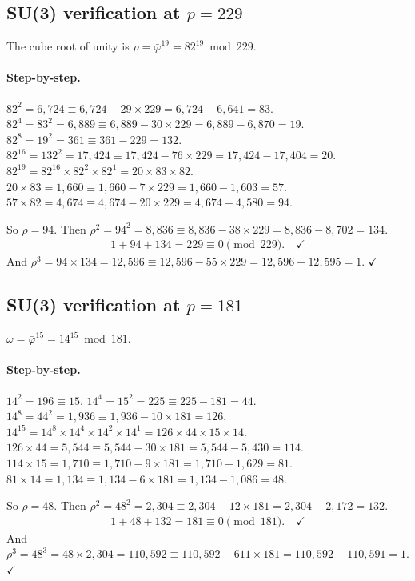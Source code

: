 \subsection{SU(3) verification at $p = 229$}

The cube root of unity is $\rho = \bar\varphi^{19} = 82^{19} \bmod 229$.

\paragraph{Step-by-step.}
$82^2 = 6{,}724 \equiv 6{,}724 - 29 \times 229 = 6{,}724 - 6{,}641 = 83$.
$82^4 = 83^2 = 6{,}889 \equiv 6{,}889 - 30 \times 229 = 6{,}889 - 6{,}870 = 19$.
$82^8 = 19^2 = 361 \equiv 361 - 229 = 132$.
$82^{16} = 132^2 = 17{,}424 \equiv 17{,}424 - 76 \times 229 = 17{,}424 - 17{,}404 = 20$.
$82^{19} = 82^{16} \times 82^2 \times 82^1 = 20 \times 83 \times 82$.
$20 \times 83 = 1{,}660 \equiv 1{,}660 - 7 \times 229 = 1{,}660 - 1{,}603 = 57$.
$57 \times 82 = 4{,}674 \equiv 4{,}674 - 20 \times 229 = 4{,}674 - 4{,}580 = 94$.

So $\rho = 94$. Then $\rho^2 = 94^2 = 8{,}836 \equiv 8{,}836 - 38 \times 229
= 8{,}836 - 8{,}702 = 134$.
\begin{align}
  1 + 94 + 134 = 229 \equiv 0 \pmod{229}. \quad\checkmark
\end{align}
And $\rho^3 = 94 \times 134 = 12{,}596 \equiv 12{,}596 - 55 \times 229
= 12{,}596 - 12{,}595 = 1$. $\checkmark$

\subsection{SU(3) verification at $p = 181$}

$\omega = \bar\varphi^{15} = 14^{15} \bmod 181$.

\paragraph{Step-by-step.}
$14^2 = 196 \equiv 15$.
$14^4 = 15^2 = 225 \equiv 225 - 181 = 44$.
$14^8 = 44^2 = 1{,}936 \equiv 1{,}936 - 10 \times 181 = 126$.
$14^{15} = 14^8 \times 14^4 \times 14^2 \times 14^1 = 126 \times 44 \times 15 \times 14$.
$126 \times 44 = 5{,}544 \equiv 5{,}544 - 30 \times 181 = 5{,}544 - 5{,}430 = 114$.
$114 \times 15 = 1{,}710 \equiv 1{,}710 - 9 \times 181 = 1{,}710 - 1{,}629 = 81$.
$81 \times 14 = 1{,}134 \equiv 1{,}134 - 6 \times 181 = 1{,}134 - 1{,}086 = 48$.

So $\rho = 48$. Then $\rho^2 = 48^2 = 2{,}304 \equiv 2{,}304 - 12 \times 181
= 2{,}304 - 2{,}172 = 132$.
\begin{align}
  1 + 48 + 132 = 181 \equiv 0 \pmod{181}. \quad\checkmark
\end{align}
And $\rho^3 = 48^3 = 48 \times 2{,}304 = 110{,}592 \equiv
110{,}592 - 611 \times 181 = 110{,}592 - 110{,}591 = 1$. $\checkmark$


